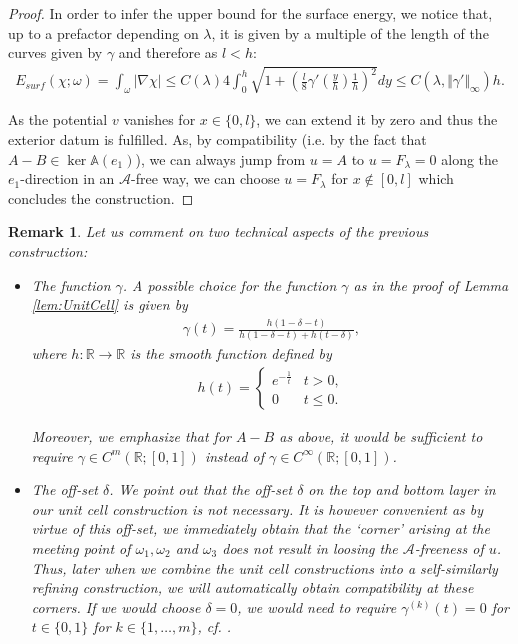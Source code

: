 \documentclass[a4paper, 10pt, twoside, notitlepage]{amsart}
\theoremstyle{plain}
\newtheorem{rmk}[prop]{Remark}
\newcommand{\R}{\mathbb{R}}
\newcommand{\A}{\mathcal{A}}
\renewcommand{\AA}{\mathbb{A}}
\begin{document}
\begin{proof}
			In order to infer the upper bound for the surface energy, we notice that, up to a prefactor depending on $\lambda$, it is given by a multiple of the length of the curves given by $\gamma$ and
			therefore as $l < h$:
			\begin{align*}
				E_{surf}(\chi;\omega) = \int_\omega |\nabla \chi| \leq C(\lambda) 4 \int_0^h \sqrt{1+\left(\frac{l}{8} \gamma' \left(\frac{y}{h} \right) \frac{1}{h} \right)^2} dy \leq C(\lambda,\Vert \gamma' \Vert_\infty) h.
			\end{align*}
			
			As the potential $v$ vanishes for $x \in \{0,l\}$, we can extend it by zero and thus the exterior datum is fulfilled.  As, by compatibility (i.e. by the fact that $A-B \in \ker \AA(e_1)$),
			we can always jump from $u = A$ to $u = F_\lambda = 0$ along the $e_1$-direction in an $\A$-free way, we can choose $u = F_\lambda$ for $x \notin [0,l]$ which concludes the construction.
		\end{proof}
		
		\begin{rmk} \label{rmk:UnitCellRemark} Let us comment on two technical aspects of the previous construction:
			\begin{itemize}
				\item \emph{The function $\gamma$.} A possible choice for the function $\gamma$ as in the proof of Lemma \ref{lem:UnitCell} is given by
				\begin{align*}
					\gamma(t) = \frac{h(1-\delta-t)}{h(1-\delta-t)+h(t-\delta)},
				\end{align*}
				where $h: \R \to \R$ is the smooth function defined by
				\begin{align*}
					h(t) = \begin{cases} e^{-\frac{1}{t}} & t>0,\\ 0 & t \leq 0. \end{cases}
				\end{align*}
				
				Moreover, we emphasize that for $A-B $ as above, it would be sufficient to require $\gamma \in C^m(\R;[0,1])$ instead of $\gamma \in C^\infty(\R;[0,1])$.
				
				\item \emph{The off-set $\delta$.} We  point out that the off-set $\delta$ on the top and bottom layer in our unit cell construction  is not necessary.  It is however convenient
				as by virtue of this off-set, we immediately obtain that the `corner' arising at the meeting point of $\omega_1,\omega_2$ and $\omega_3$ does not result in loosing the $\A$-freeness of $u$. Thus, later
				when we combine the unit cell constructions into a self-similarly refining construction, we will automatically obtain compatibility at these corners.  If we would choose $\delta = 0$, we would  need to require
				$\gamma^{(k)}(t) = 0$ for $ t \in \{0,1\}$ for $k \in\{ 1,\dots,m\}$, cf. \cite{CC15}.
			\end{itemize}
		\end{rmk}
		
\end{document}
